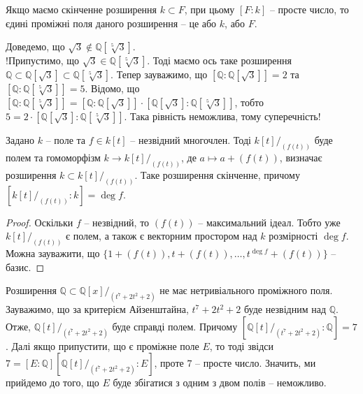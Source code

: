 \documentclass{math_library}
\begin{document}
\begin{remark}
Якщо маємо скінченне розширення $k \subset F$, при цьому $[F:k]$ -- просте число, то єдині проміжні поля даного розширення -- це або $k$, або $F$.
\end{remark}

\begin{example}
Доведемо, що $\sqrt{3} \notin \mathbb{Q}[\sqrt[5]{3}]$.\\
!Припустимо, що $\sqrt{3} \in \mathbb{Q}[\sqrt[5]{3}]$. Тоді маємо ось таке розширення $\mathbb{Q} \subset \mathbb{Q}[\sqrt{3}] \subset \mathbb{Q}[\sqrt[5]{3}]$. Тепер зауважимо, що $[\mathbb{Q}: \mathbb{Q}[\sqrt{3}]] = 2$ та $[\mathbb{Q} : \mathbb{Q}[\sqrt[5]{3}]] = 5$. Відомо, що $[\mathbb{Q}: \mathbb{Q}[\sqrt[5]{3}]] = [\mathbb{Q} : \mathbb{Q}[\sqrt{3}]] \cdot [\mathbb{Q}[\sqrt{3}] : \mathbb{Q}[\sqrt[5]{3}]]$,  тобто $5 = 2 \cdot [\mathbb{Q}[\sqrt{3}] : \mathbb{Q}[\sqrt[5]{3}]]$. Така рівність неможлива, тому суперечність!
\end{example}

\begin{proposition}
Задано $k$ -- поле та $f \in k[t]$ -- незвідний многочлен. Тоді $k[t]/_{(f(t))}$ буде полем та гомоморфізм $k \to k[t]/_{(f(t))}$, де $a \mapsto a + (f(t))$, визначає розширення $k \subset k[t]/_{(f(t))}$. Таке розширення скінченне, причому $\left[ k[t]/_{(f(t))} : k \right] = \deg f$.
\end{proposition}

\begin{proof}
Оскільки $f$ -- незвідний, то $(f(t))$ -- максимальний ідеал. Тобто уже $k[t]/_{(f(t))}$ є полем, а також є векторним простором над $k$ розмірності $\deg f$.\\
Можна зауважити, що $\{1 + (f(t)), t + (f(t)), \dots, t^{\deg f} + (f(t))\}$ -- базис.
\end{proof}

\begin{example}
Розширення $\mathbb{Q} \subset \mathbb{Q}[x]/_{(t^7+2t^2+2)}$ не має нетривіального проміжного поля.\\
Зауважимо, що за критерієм Айзенштайна, $t^7 + 2t^2 +2$ буде незвідним над $\mathbb{Q}$. Отже, $\mathbb{Q}[t]/_{(t^7+2t^2+2)}$ буде справді полем. Причому $\left[\mathbb{Q}[t]/_{(t^7+2t^2+2)} : \mathbb{Q} \right] = 7$. Далі якщо припустити, що є проміжне поле $E$, то тоді звідси $7 = [E: \mathbb{Q}] \left[ \mathbb{Q}[t]/_{(t^7 + 2t^2+2)} : E \right]$, проте $7$ -- просте число. Значить, ми прийдемо до того, що $E$ буде збігатися з одним з двом полів -- неможливо.
\end{example}
\end{document}
